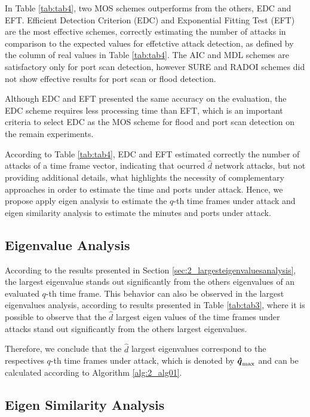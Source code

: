 In Table \ref{tab:tab4}, two MOS schemes outperforms from the others, EDC and EFT. Efficient Detection Criterion (EDC) and Exponential Fitting Test (EFT) are the most effective schemes, correctly estimating the number of attacks in comparison to the expected values for effetctive attack detection, as defined by the column of real values in Table \ref{tab:tab4}. The AIC and MDL schemes are satisfactory only for port scan detection, however SURE and RADOI schemes did not show effective results for port scan or flood detection.

Although EDC and EFT presented the same accuracy on the evaluation, the EDC scheme requires less processing time than EFT, which is an important criteria to select EDC as the MOS scheme for flood and port scan detection on the remain experiments.

According to Table \ref{tab:tab4}, EDC and EFT estimated correctly the number of attacks of a time frame vector, indicating that ocurred $\hat{d}$ network attacks, but not providing additional details, what highlights the necessity of complementary approaches in order to estimate the time and ports under attack. Hence, we propose apply eigen analysis to estimate the $q$-th time frames under attack and eigen similarity analysis to estimate the minutes and ports under attack.

\subsection{Eigenvalue Analysis}
\label{sec:2_EigenvalueAnalysis}

According to the results presented in Section \ref{sec:2_largesteigenvaluesanalysis}, the largest eigenvalue stands out significantly from the others eigenvalues of an evaluated $q$-th time frame. This behavior can also be observed in the largest eigenvalues analysis, according to results presented in Table \ref{tab:tab3}, where it is possible to observe that the $\hat{d}$ largest eigen values of the time frames under attacks stand out significantly from the others largest eigenvalues. 

Therefore, we conclude that the $\hat{d}$ largest eigenvalues correspond to the respectives $q$-th time frames under attack, which is denoted by $\rm{\boldsymbol{\hat{q}}}_{\rm max}$ and can be calculated according to Algorithm \ref{alg:2_alg01}.

\subsection{Eigen Similarity Analysis}
\label{sec:2_EigenSimilarityAnalysis}

